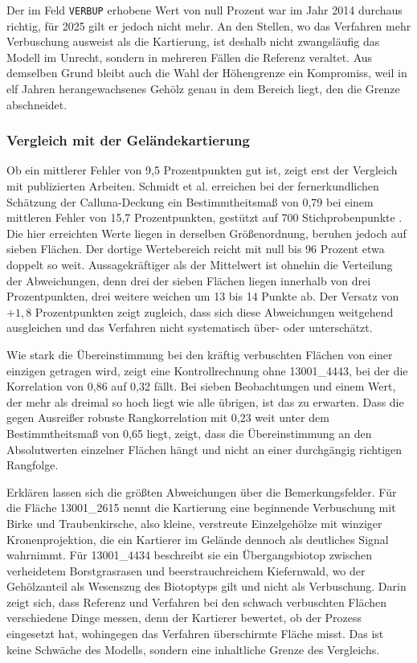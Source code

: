 Der im Feld \texttt{VERBUP} erhobene Wert von null Prozent war im Jahr 2014
durchaus richtig, für 2025 gilt er jedoch nicht mehr. An den Stellen, wo das Verfahren mehr Verbuschung ausweist als die Kartierung, ist deshalb nicht zwangsläufig das Modell im Unrecht, sondern in mehreren Fällen die Referenz veraltet. Aus demselben Grund bleibt auch die Wahl der Höhengrenze ein Kompromiss, weil in elf Jahren herangewachsenes Gehölz genau in dem Bereich liegt, den die Grenze abschneidet.

\subsubsection{Vergleich mit der Geländekartierung}

Ob ein mittlerer Fehler von 9,5 Prozentpunkten gut ist, zeigt erst der
Vergleich mit publizierten Arbeiten. Schmidt et al. erreichen bei der
fernerkundlichen Schätzung der Calluna-Deckung ein Bestimmtheitsmaß von 0,79
bei einem mittleren Fehler von 15,7 Prozentpunkten, gestützt auf 700
Stichprobenpunkte \cite{Schmidt.2017}. Die hier erreichten Werte liegen in derselben Größenordnung, beruhen jedoch auf sieben Flächen. Der dortige Wertebereich reicht mit null bis 96 Prozent etwa doppelt so weit. Aussagekräftiger als der Mittelwert ist ohnehin die Verteilung der Abweichungen, denn drei der sieben Flächen liegen innerhalb von drei Prozentpunkten, drei weitere weichen um 13 bis 14 Punkte ab. Der Versatz von $+1,8$ Prozentpunkten zeigt zugleich, dass sich diese Abweichungen weitgehend ausgleichen und das Verfahren nicht systematisch über- oder
unterschätzt.

Wie stark die Übereinstimmung bei den kräftig verbuschten Flächen von einer einzigen
getragen wird, zeigt eine Kontrollrechnung ohne 13001\_4443, bei der die
Korrelation von 0,86 auf 0,32 fällt. Bei sieben Beobachtungen und einem Wert,
der mehr als dreimal so hoch liegt wie alle übrigen, ist das zu erwarten. Dass die gegen Ausreißer robuste Rangkorrelation mit 0,23 weit unter dem Bestimmtheitsmaß von 0,65 liegt, zeigt, dass die Übereinstimmung an den Absolutwerten einzelner Flächen hängt und nicht an einer durchgängig richtigen Rangfolge.

Erklären lassen sich die größten Abweichungen über die Bemerkungsfelder. Für
die Fläche 13001\_2615 nennt die Kartierung eine beginnende Verbuschung mit
Birke und Traubenkirsche, also kleine, verstreute Einzelgehölze mit winziger
Kronenprojektion, die ein Kartierer im Gelände dennoch als deutliches Signal
wahrnimmt. Für 13001\_4434 beschreibt sie ein Übergangsbiotop zwischen
verheidetem Borstgrasrasen und beerstrauchreichem Kiefernwald, wo der
Gehölzanteil als Wesenszug des Biotoptyps gilt und nicht als Verbuschung. Darin
zeigt sich, dass Referenz und Verfahren bei den schwach verbuschten Flächen verschiedene Dinge messen, denn der Kartierer bewertet, ob der Prozess eingesetzt hat, wohingegen das Verfahren überschirmte Fläche misst. Das ist keine Schwäche des
Modells, sondern eine inhaltliche Grenze des Vergleichs.

